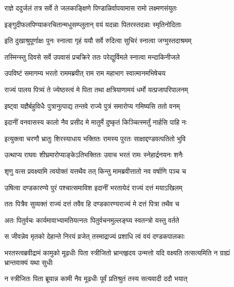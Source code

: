 \twolineshloka
{राज्ञे ददुर्जलं तत्र सर्वे ते जलकाङ्क्षिणे}
{पिण्डान्निर्वापयामास रामो लक्ष्मणसंयुतः} %

\twolineshloka
{इङ्गुदीफलपिण्याकरचितान्मधुसम्प्लुतान्}
{वयं यदन्नाः पितरस्तदन्नाः स्मृतिनोदिताः} %

\twolineshloka
{इति दुखाश्रुपूर्णाक्षः पुनः स्नात्वा गृहं ययौ}
{सर्वे रुदित्वा सुचिरं स्नात्वा जग्मुस्तदाश्रमम्} %

\twolineshloka
{तस्मिन्स्तु दिवसे सर्वे उपवासं प्रचक्रिरे}
{ततः परेद्युर्विमले स्नात्वा मन्दाकिनीजले} %

\twolineshloka
{उपविष्टं समागम्य भरतो राममब्रवीत्}
{राम राम महाभाग स्वात्मानमभिषेचय} %

\twolineshloka
{राज्यं पालय पित्र्यं ते ज्येष्ठस्त्वं मे पिता तथा}
{क्षत्रियाणामयं धर्मो यत्प्रजापरिपालनम्} %

\twolineshloka
{इष्ट्वा यज्ञैर्बहुविधैः पुत्रानुत्पाद्य तन्तवे}
{राज्ये पुत्रं समारोप्य गमिष्यसि ततो वनम्} %

\twolineshloka
{इदानीं वनवासस्य कालो नैव प्रसीद मे}
{मातुर्मे दुष्कृतं किञ्चित्स्मर्तुं नार्हसि पाहि नः} %

\twolineshloka
{इत्युक्त्वा चरणौ भ्रातुः शिरस्याधाय भक्तितः}
{रामस्य पुरतः साक्षाद्दण्डवत्पतितो भुवि} %

\twolineshloka
{उत्थाप्य राघवः शीघ्रमारोप्याङ्केऽतिभक्तितः}
{उवाच भरतं रामः स्नेहार्द्रनयनः शनैः} %

\twolineshloka
{शृणु वत्स प्रवक्ष्यामि त्वयोक्तं यत्तथैव तत्}
{किन्तु मामब्रवीत्तातो नव वर्षाणि पञ्च च} %

\twolineshloka
{उषित्वा दण्डकारण्ये पुरं पश्चात्समाविश}
{इदानीं भरतायेदं राज्यं दत्तं मयाऽखिलम्} %

\twolineshloka
{ततः पित्रैव सुव्यक्तं राज्यं दत्तं तवैव हि}
{दण्डकारण्यराज्यं मे दत्तं पित्रा तथैव च} %

\twolineshloka
{अतः पितुर्वचः कार्यमावाभ्यामतियत्नतः}
{पितुर्वचनमुल्लङ्घ्य स्वतन्त्रो यस्तु वर्तते} %

\twolineshloka
{स जीवन्नेव मृतको देहान्ते निरयं व्रजेत्}
{तस्माद्राज्यं प्रशाधि त्वं वयं दण्डकपालकाः} %

\threelineshloka
{भरतस्त्वब्रवीद्रामं कामुको मूढधीः पिता}
{स्त्रीजितो भ्रान्तहृदय उन्मत्तो यदि वक्ष्यति}
{तत्सत्यमिति न ग्राह्यं भ्रान्तवाक्यं यथा सुधीः} %


\twolineshloka
{न स्त्रीजितः पिता ब्रूयान्न कामी नैव मूढधीः}
{पूर्वं प्रतिश्रुतं तस्य सत्यवादी ददौ भयात्} %

